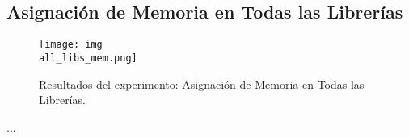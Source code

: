 \subsection{Asignación de Memoria en Todas las Librerías}
\label{exp:all-libs-mem}

\begin{figure}[H]
    \centering
    \texttt{[image: img\\all\_libs\_mem.png]}
    \caption{Resultados del experimento: Asignación de Memoria en Todas las Librerías.}
    \label{fig:all-libs-mem}
\end{figure}

...
